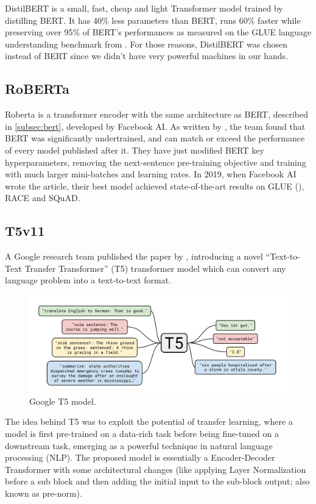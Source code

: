 DistilBERT is a small, fast, cheap and light Transformer model trained by distilling BERT. It has 40\% less parameters than BERT, runs 60\% faster while preserving over 95\% of BERT’s performances as measured on the GLUE language understanding benchmark from \cite{wang2018glue}. For those reasons, DistilBERT was chosen instead of BERT since we didn't have very powerful machines in our hands.

\subsection{RoBERTa}
Roberta is a transformer encoder with the same architecture as BERT, described in \ref{subsec:bert}, developed by Facebook AI. As written by \cite{liu2019roberta}, the team found that BERT was significantly undertrained, and can match or exceed the performance of every model published after it. They have just modified BERT key hyperparameters, removing the next-sentence pre-training objective and training with much larger mini-batches and learning rates. In 2019, when Facebook AI wrote the article, their best model achieved state-of-the-art results on GLUE (\cite{wang2018glue}), RACE and SQuAD.
\subsection{T5v11}
A Google research team published the paper by \cite{raffel2019exploring}, introducing a novel “Text-to-Text Transfer Transformer” (T5) transformer model which can convert any language problem into a text-to-text format.
\begin{figure}[H]
    \centering
    \includegraphics[width = .7\linewidth]{images/google_T5.png}
    \caption{Google T5 model.}
    \label{fig:google_t5}
\end{figure}
The idea behind T5 was to exploit the potential of transfer learning, where a model is first pre-trained on a data-rich task before being fine-tuned on a downstream task, emerging as a powerful technique in natural language processing (NLP). The proposed model is essentially a Encoder-Decoder Transformer with some architectural changes (like applying Layer Normalization before a sub block and then adding the initial input to the sub-block output; also known as pre-norm).
\vspace{3mm}

